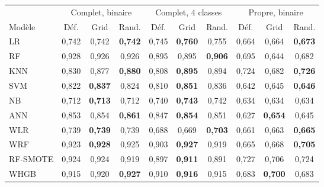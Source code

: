 \begin{tabular}{lccccccccc}
\toprule
& \multicolumn{3}{c}{Complet, binaire} & \multicolumn{3}{c}{Complet, 4 classes} & \multicolumn{3}{c}{Propre, binaire} \\\cmidrule(lr){2-4}\cmidrule(lr){5-7}\cmidrule(lr){8-10}
Modèle & Déf. & Grid & Rand. & Déf. & Grid & Rand. & Déf. & Grid & Rand. \\
\midrule
LR & 0,742 & 0,742 & \textbf{0,742} & 0,745 & \textbf{0,760} & 0,755 & 0,664 & 0,664 & \textbf{0,673} \\
RF & 0,928 & 0,926 & 0,926 & 0,895 & 0,895 & \textbf{0,906} & 0,695 & 0,644 & 0,682 \\
KNN & 0,830 & 0,877 & \textbf{0,880} & 0,808 & \textbf{0,895} & 0,894 & 0,724 & 0,682 & \textbf{0,726} \\
SVM & 0,822 & \textbf{0,837} & 0,824 & 0,810 & \textbf{0,851} & 0,836 & 0,642 & 0,645 & \textbf{0,646} \\
NB & 0,712 & \textbf{0,713} & 0,712 & 0,740 & \textbf{0,743} & 0,742 & 0,634 & 0,634 & 0,634 \\
ANN & 0,853 & 0,854 & \textbf{0,861} & 0,847 & \textbf{0,854} & 0,851 & 0,627 & \textbf{0,654} & 0,645 \\
\midrule
WLR & 0,739 & \textbf{0,739} & 0,739 & 0,688 & 0,669 & \textbf{0,703} & 0,661 & 0,663 & \textbf{0,665} \\
WRF & 0,923 & \textbf{0,928} & 0,925 & 0,903 & \textbf{0,927} & 0,919 & 0,665 & 0,668 & \textbf{0,705} \\
RF-SMOTE & 0,924 & 0,924 & 0,919 & 0,897 & \textbf{0,911} & 0,891 & 0,727 & 0,706 & 0,724 \\
WHGB & 0,915 & 0,920 & \textbf{0,927} & 0,910 & \textbf{0,916} & 0,915 & 0,683 & \textbf{0,700} & 0,683 \\
\bottomrule
\end{tabular}